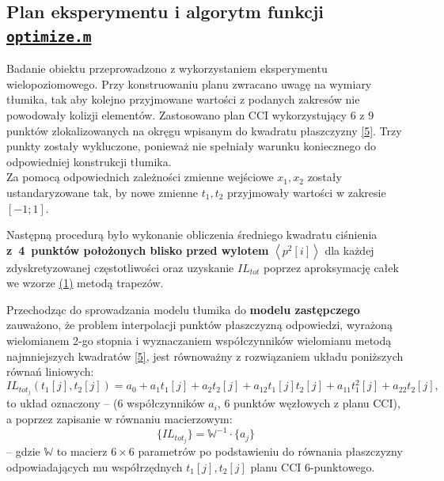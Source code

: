 \documentclass{sprawozdanie-agh}
\begin{document}
\subsection{Plan eksperymentu i algorytm funkcji \texttt{\hyperref[list6]{optimize.m}}}
\par Badanie obiektu przeprowadzono z wykorzystaniem eksperymentu wielopoziomowego. Przy konstruowaniu planu zwracano uwagę na wymiary tłumika, tak aby kolejno przyjmowane wartości z podanych zakresów nie powodowały kolizji elementów. Zastosowano plan CCI wykorzystujący 6 z 9 punktów zlokalizowanych na okręgu wpisanym do kwadratu płaszczyzny \hyperref[ref5]{[5]}. Trzy punkty zostały wykluczone, ponieważ nie spełniały warunku koniecznego do odpowiedniej konstrukcji tłumika.\\Za pomocą odpowiednich zależności zmienne wejściowe $x_1,x_2$ zostały ustandaryzowane tak, by nowe zmienne $t_1,t_2$ przyjmowały wartości w zakresie $[-1;1]$.
\par Następną procedurą było wykonanie obliczenia średniego kwadratu ciśnienia \textbf{z~4~punktów położonych blisko przed wylotem} $\left \langle p^2[i]\right\rangle$ dla każdej zdyskretyzowanej częstotliwości oraz uzyskanie $IL_{tot}$ poprzez aproksymację całek we wzorze \hyperref[eq]{(1)} metodą trapezów.
\par Przechodząc do sprowadzania modelu tłumika do \textbf{modelu zastępczego} zauważono, że problem interpolacji punktów płaszczyzną odpowiedzi, wyrażoną wielomianem 2-go stopnia i wyznaczaniem współczynników wielomianu metodą najmniejszych kwadratów \hyperref[ref5]{[5]}, jest równoważny z rozwiązaniem układu poniższych równań liniowych:
\[IL_{tot_{j}}(t_{1}[j],t_{2}[j])=a_0+a_1 t_{1}[j]+a_2 t_{2}[j]+a_{12}t_{1}[j] t_{2}[j]+a_{11}t_{1}^2[j]+a_{22}t_{2}[j],\]
to układ oznaczony -- (6 współczynników $a_i$, 6 punktów węzłowych z planu CCI), a poprzez zapisanie w równaniu macierzowym:
\begin{equation}
    \{IL_{tot_{j}}\}=\mathbb{W}^{-1}\cdot\{a_j\}
\end{equation}
-- gdzie $\mathbb{W}$ to macierz $6\times6$ parametrów po podstawieniu do równania płaszczyzny odpowiadających mu współrzędnych $t_1[j],t_2[j]$ planu CCI 6-punktowego.
\end{document}
